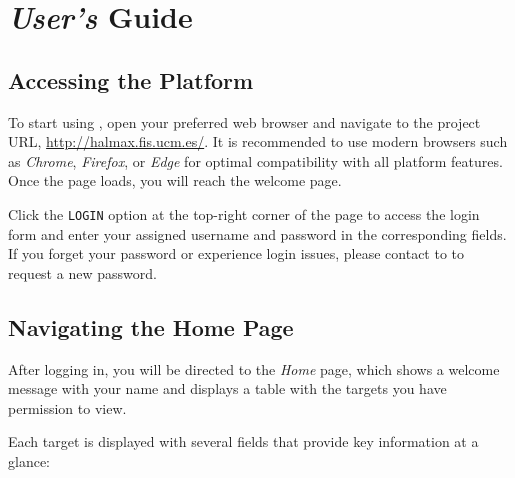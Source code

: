 
\part{\textsl{User's} Guide} \label{part:user}

    
\chapter{Accessing the Platform} \label{chap:user-access}

To start using \app, open your preferred web browser and navigate to the project URL, \url{http://halmax.fis.ucm.es/}. It is recommended to use modern browsers such as \textsl{Chrome}, \textsl{Firefox}, or \textsl{Edge} for optimal compatibility with all platform features. Once the page loads, you will reach the welcome page. 


Click the \texttt{LOGIN} option at the top-right corner of the page to access the login form and enter your assigned username and password in the corresponding fields. If you forget your password or experience login issues, please contact to \prjUrl to request a new password.




\chapter{Navigating the Home Page} \label{chap:user-homepage}

After logging in, you will be directed to the \textsl{Home} page, which shows a welcome message with your name and displays a table with the targets you have permission to view.



Each target is displayed with several fields that provide key information at a glance:

